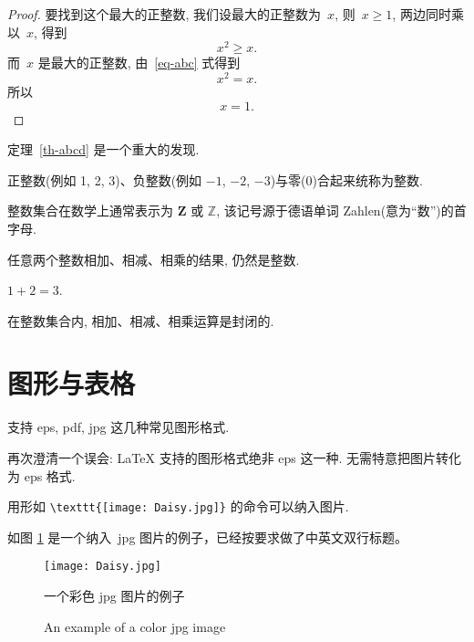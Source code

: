 \documentclass[smd,entitle,forlib,AutoFakeBold]{NJTECHMaster}
\begin{document}
\begin{proof}
	要找到这个最大的正整数, 我们设最大的正整数为~$x$, 则~$x \geqslant 1$, 两边同时乘以~$x$, 得到
	\begin{equation}\label{eq-abc}
		x^2 \geqslant x.
	\end{equation}
	而~$x$ 是最大的正整数, 由~\eqref{eq-abc} 式得到
	\[
	x^2 = x.
	\]
	所以
	\begin{equation*}
		x = 1.
	\end{equation*}
\end{proof}

定理~\ref{th-abcd} 是一个重大的发现.

\begin{definition}[整数]
	正整数(例如 1, 2, 3)、负整数(例如 ${−1}$, $−2$, $−3$)与零(0)合起来统称为{\heiti 整数}.
\end{definition}

\begin{remark}
	整数集合在数学上通常表示为 $\mathbf{Z}$ 或 $\mathbb{Z}$, 该记号源于德语单词 Zahlen(意为``数'')的首字母.
\end{remark}

\begin{proposition}
	任意两个整数相加、相减、相乘的结果, 仍然是整数.
\end{proposition}

\begin{example}
	$1+2=3$.
\end{example}

\begin{corollary}
	在整数集合内, 相加、相减、相乘运算是封闭的.
\end{corollary}

\section{图形与表格}

支持 eps, pdf, jpg 这几种常见图形格式.

再次澄清一个误会: \LaTeX{} 支持的图形格式绝非 eps 这一种. 无需特意把图片转化为 eps 格式.

用形如 \verb|\texttt{[image: Daisy.jpg]}| 的命令可以纳入图片.

如图 \ref{fig:1} 是一个纳入~jpg 图片的例子，已经按要求做了中英文双行标题。

\begin{figure}[ht]
	\centering
	\texttt{[image: Daisy.jpg]}
	\vspace{1pt}
	\caption{一个彩色 jpg 图片的例子}
	\addtocounter{figure}{-1}
	\renewcommand{\figurename}{Figure}
	\caption{An example of a color jpg image}
	\renewcommand{\figurename}{图}
	\label{fig:1}
\end{figure}
\end{document}
